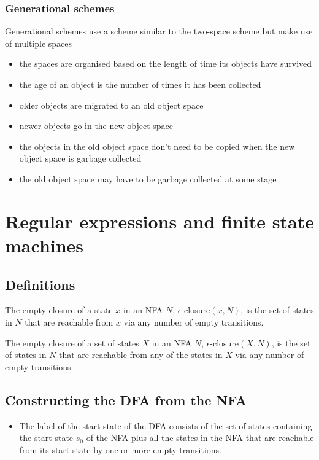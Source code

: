 \documentclass[fontsize=10pt,a4paper]{article}
\begin{document}
\begin{multicols}{3}
    \subsubsection{Generational schemes}

    Generational schemes use a scheme similar to the two-space scheme but make use of multiple spaces

    \begin{itemize}
        \item the spaces are organised based on the length of time its objects have survived
        \item the age of an object is the number of times it has been collected
        \item older objects are migrated to an old object space
        \item newer objects go in the new object space
        \item the objects in the old object space don’t need to be copied when the new object space is garbage collected
        \item the old object space may have to be garbage collected at some stage
    \end{itemize}

    \section{Regular expressions and finite state machines}

    \subsection{Definitions}

    The empty closure of a state $x$ in an NFA $N$, $\epsilon$-closure$(x, N)$, is the set of states in $N$ that are reachable from $x$ via any number of empty transitions.

    The empty closure of a set of states $X$ in an NFA $N$, $\epsilon$-closure$(X, N)$, is the set of states in $N$ that are reachable from any of the states in $X$ via any number of empty transitions.

    \subsection{Constructing the DFA from the NFA}

    \begin{itemize}
        \item The label of the start state of the DFA consists of the set of states containing the start state $s_0$ of the NFA plus all the states in the NFA that are reachable from its start state by one or more empty transitions.


\end{itemize}
\end{multicols}
\end{document}
